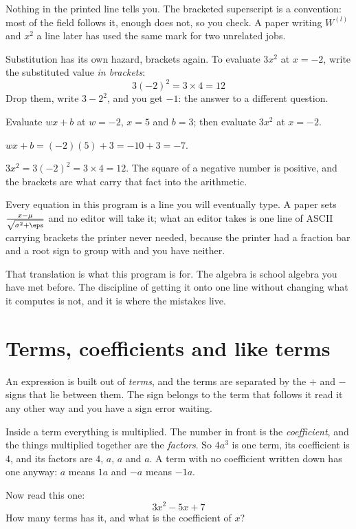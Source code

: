 \begin{fr}
Nothing in the printed line tells you. The bracketed superscript is a
convention: most of the field follows it, enough does not, so you check. A
paper writing $W^{(l)}$ and $x^{2}$ a line later has used the same mark for
two unrelated jobs.

Substitution has its own hazard, brackets again. To evaluate
$3x^{2}$ at $x = -2$, write the substituted value \emph{in brackets}:
\[ 3(-2)^{2} = 3 \times 4 = 12 \]
Drop them, write $3-2^{2}$, and you get $-1$: the answer to a different
question.

\yourturn
Evaluate $wx + b$ at $w = -2$, $x = 5$ and $b = 3$; then evaluate $3x^{2}$ at
$x = -2$.
\dotline
\nextframe
\end{fr}

\begin{fr}
\begin{ansblock}
$wx + b = (-2)(5) + 3 = -10 + 3 = -7$.

$3x^{2} = 3(-2)^{2} = 3 \times 4 = 12$. The square of a negative number is
positive, and the brackets are what carry that fact into the arithmetic.
\end{ansblock}

\begin{aibox}
Every equation in this program is a line you will eventually type. A paper sets
$\frac{x - \mu}{\sqrt{\sigma^{2} + \eps}}$ and no editor will take it; what an
editor takes is one line of ASCII carrying brackets the printer never needed,
because the printer had a fraction bar and a root sign to group with and you
have neither.

That translation is what this program is for. The algebra is school algebra you
have met before. The discipline of getting it onto one line without changing
what it computes is not, and it is where the mistakes live.
\end{aibox}
\end{fr}

\section{Terms, coefficients and like terms}
\label{sec:F02-terms}

\begin{fr}
An expression is built out of \emph{terms}, and the terms are separated by the
$+$ and $-$ signs that lie between them. The sign belongs to the term that
follows it \dash{} read it any other way and you have a sign error waiting.

Inside a term everything is multiplied. The number in front is the
\emph{coefficient}, and the things multiplied together are the \emph{factors}.
So $4a^{3}$ is one term, its coefficient is $4$, and its factors are $4$, $a$,
$a$ and $a$. A term with no coefficient written down has one anyway: $a$ means
$1a$ and $-a$ means $-1a$.

Now read this one:
\[ 3x^{2} - 5x + 7 \]
How many terms has it, and what is the coefficient of $x$?
\nextframe
\end{fr}

